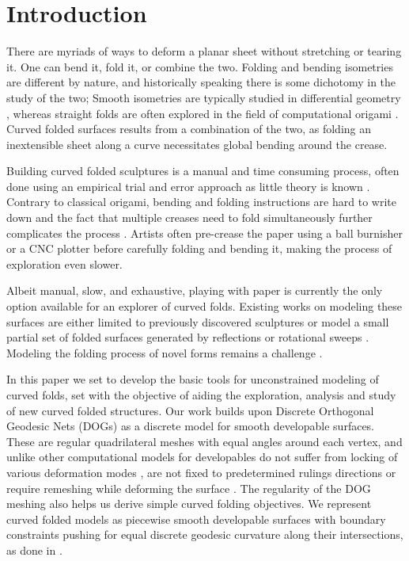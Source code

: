 \section{Introduction}
There are myriads of ways to deform a planar sheet without stretching or tearing it. One can bend it, fold it, or combine the two. Folding and bending isometries are different by nature, and historically speaking there is some dichotomy in the study of the two; Smooth isometries are typically studied in differential geometry \cite{do_carmo}, whereas straight folds are often explored in the field of computational origami \cite{origami_book}. Curved folded surfaces \cite{huffman} results from a combination of the two, as folding an inextensible sheet along a curve necessitates global bending around the crease.

Building curved folded sculptures is a manual and time consuming process, often done using an empirical trial and error approach  as little theory is known \cite{curved_review,huffmann_reconstructing}. Contrary to classical origami, bending and folding instructions are hard to write down and the fact that multiple creases need to fold simultaneously further complicates the process \cite{StringActuated:2017}. Artists often pre-crease the paper using a ball burnisher or a CNC plotter before carefully folding and bending it, making the process of exploration even slower. 

Albeit manual, slow, and exhaustive, playing with paper is currently the only option available for an explorer of curved folds. Existing works on modeling these surfaces are either limited to previously discovered sculptures \cite{curved_folding_kilian,StringActuated:2017} or model a small partial set of folded surfaces generated by reflections or rotational sweeps \cite{Mitani_ref,mitani2009design}. Modeling the folding process of novel forms remains a challenge \cite{curved_review}. 

In this paper we set to develop the basic tools for unconstrained modeling of curved folds, set with the objective of aiding the exploration, analysis and study of new curved folded structures. Our work builds upon Discrete Orthogonal Geodesic Nets (DOGs) \cite{rabi18,rabi2018shape} as a discrete model for smooth developable surfaces. These are regular quadrilateral meshes with equal angles around each vertex, and unlike other computational models for developables do not suffer from locking of various deformation modes \cite{locking1,locking2,grin_shells}, are not fixed to predetermined rulings directions \cite{pottmann_new,curved_folding_kilian} or require remeshing while deforming the surface \cite{StringActuated:2017,SchreckEG2017,Narain}. The regularity of the DOG meshing also helps us derive simple curved folding objectives. We represent curved folded models as piecewise smooth developable surfaces with boundary constraints pushing for equal discrete geodesic curvature along their intersections, as done in \cite{rabi2018shape}.

